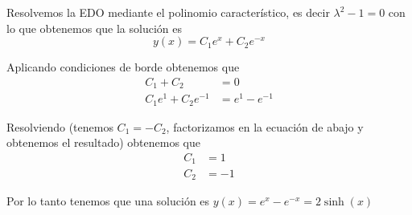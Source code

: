 \documentclass[a4paper,oneside,10.5pt]{USMArt}
\begin{document}
\begin{sol}
  Resolvemos la EDO mediante el polinomio característico, es decir $\lambda^{2} - 1 = 0$ con lo que obtenemos que
  la solución es
  \begin{equation*}
    y(x) = C_{1}e^{x} + C_{2}e^{-x}
  \end{equation*}

  Aplicando condiciones de borde obtenemos que
  \begin{align*}
    C_{1} + C_{2} &= 0\\
    C_{1}e^{1} + C_{2}e^{-1} &= e^{1} - e^{-1}
  \end{align*}

  Resolviendo (tenemos $C_{1} = -C_{2}$, factorizamos en la ecuación de abajo y obtenemos el resultado) obtenemos que
  \begin{align*}
    C_{1} &= 1\\
    C_{2} &= -1
  \end{align*}

  Por lo tanto tenemos que una solución es $y(x) = e^{x} - e^{-x} = 2 \sinh(x)$
\end{sol}
\end{document}
